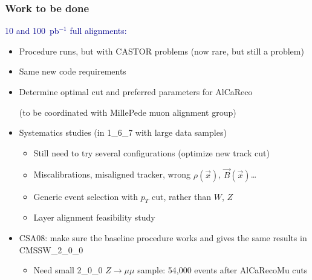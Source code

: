 \documentclass[compress]{beamer}
\begin{document}
\begin{frame}
\frametitle{Work to be done}
\textcolor{darkblue}{10 and 100~pb$^{-1}$ full alignments:}
\begin{itemize}\setlength{\itemsep}{0.25 cm}
\item Procedure runs, but with CASTOR problems (now rare, but still a problem)
\item Same new code requirements
\item Determine optimal cut and preferred parameters for AlCaReco

(to be coordinated with MillePede muon alignment group)
\item Systematics studies (in 1\_6\_7 with large data samples)
\begin{itemize}
\item Still need to try several configurations (optimize new track cut)
\item Miscalibrations, misaligned tracker, wrong $\rho(\vec{x})$, $\vec{B}(\vec{x})$\ldots
\item Generic event selection with $p_T$ cut, rather than $W$, $Z$
\item Layer alignment feasibility study
\end{itemize}
\item CSA08: make sure the baseline procedure works and gives the same results in CMSSW\_2\_0\_0
\begin{itemize}
\item Need small 2\_0\_0 $Z\to\mu\mu$ sample: 54,000 events after AlCaRecoMu cuts
\end{itemize}
\end{itemize}
\end{frame}
\end{document}
